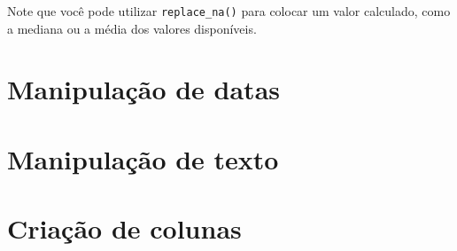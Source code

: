 \documentclass{book}
\begin{document}
Note que você pode utilizar \texttt{replace\_na()} para colocar um valor calculado, como a mediana ou a média dos valores disponíveis.

\section{Manipulação de datas}
\section{Manipulação de texto}
\section{Criação de colunas}  %
\end{document}

